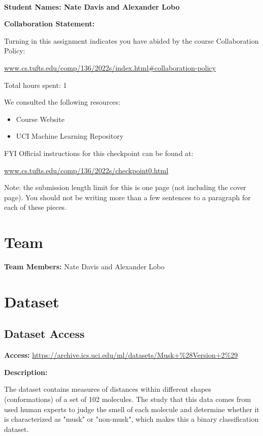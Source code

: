 \documentclass[12pt]{article}
\begin{document}
~~\\ %

{\Large{\bf Student Names: Nate Davis and Alexander Lobo}}


{\Large{\bf Collaboration Statement:}}

Turning in this assignment indicates you have abided by the course Collaboration Policy:

\url{www.cs.tufts.edu/comp/136/2022s/index.html#collaboration-policy}

Total hours spent: 1

We consulted the following resources:
\begin{itemize}
\item Course Website
\item UCI Machine Learning Repository
\end{itemize}

FYI Official instructions for this checkpoint can be found at:

\url{www.cs.tufts.edu/comp/136/2022s/checkpoint0.html}


\newpage

Note: the submission length limit for this is one page (not including the cover page).  You should not be writing more than a few sentences to a paragraph for each of these pieces.

\section{Team}

\textbf{Team Members:} Nate Davis and Alexander Lobo

\section{Dataset}

\subsection{Dataset Access}

\textbf{Access:} \url{https://archive.ics.uci.edu/ml/datasets/Musk+%28Version+2%29}

\textbf{Description:}

The dataset contains measures of distances within different shapes (conformations) of a set of 102 molecules. The study that this data comes from used human experts to judge the smell of each molecule and determine whether it is characterized as "musk" or "non-musk", which makes this a binary classification dataset.
\end{document}
